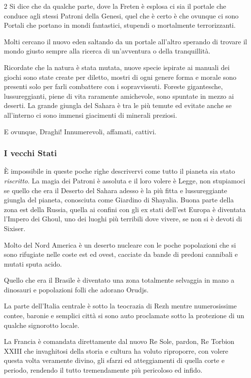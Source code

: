 \begin{multicols}{2}
Si dice che da qualche parte, dove la Freten è esplosa ci sia il portale che conduce agli stessi Patroni della Genesi, quel che è certo è che ovunque ci sono Portali che portano in mondi fantastici, stupendi o mortalmente terrorizzanti.

Molti cercano il nuovo eden saltando da un portale all'altro sperando di trovare il mondo giusto sempre alla ricerca di un'avventura o della tranquillità.

Ricordate che la natura è stata mutata, nuove specie ispirate ai manuali dei giochi sono state create per diletto, mostri di ogni genere forma e morale sono presenti solo per farli combattere con i sopravvissuti. Foreste gigantesche, lussureggianti, piene di vita raramente amichevole, sono spuntate in mezzo ai deserti. La grande giungla del Sahara è tra le più temute ed evitate anche se all'interno ci sono immensi giacimenti di minerali preziosi.

E ovunque, Draghi! Innumerevoli, affamati, cattivi.

\subsubsection{I vecchi Stati}

È impossibile in queste poche righe descrivervi come tutto il pianeta sia stato \emph{riscritto}. La magia dei Patroni è assoluta e il loro volere è Legge, non stupiamoci se quello che era il Deserto del Sahara adesso è la più fitta e lussureggiante giungla del pianeta, conosciuta come Giardino di Shayalia.
Buona parte della zona est della Russia, quella ai confini con gli ex stati dell'est Europa è diventata l'Impero dei Ghoul, uno dei luoghi più terribili dove vivere, se non si è devoti di Sixiser.

Molto del Nord America è un deserto nucleare con le poche popolazioni che si sono rifugiate nelle coste est ed ovest, cacciate da bande di predoni cannibali e mutati sputa acido.

Quello che era il Brasile è diventato una zona totalmente selvaggia in mano a dinosauri e popolazioni folli che adorano Orudjs.

La parte dell'Italia centrale è sotto la teocrazia di Rezh mentre numerosissime contee, baronie e semplici città si sono auto proclamate sotto la protezione di un qualche signorotto locale.

La Francia è comandata direttamente dal nuovo Re Sole, pardon, Re Torbion XXIII che invaghitosi della storia e cultura ha voluto riproporre, con volere questa volta veramente divino, gli sfarzi ed atteggiamenti di quella corte e periodo, rendendo il tutto tremendamente più pericoloso ed infido.


\end{multicols}
